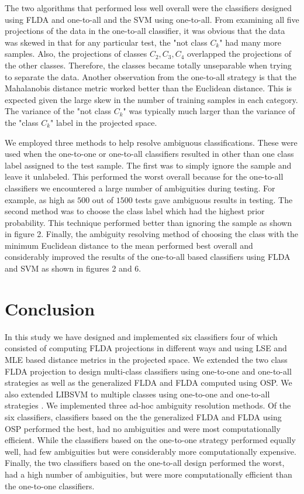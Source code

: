 \documentclass[journal]{IEEEtran}
\begin{document}
\par The two algorithms that performed less well overall were the classifiers designed using FLDA and one-to-all and the SVM using one-to-all. From examining all five projections of the data in the one-to-all classifier, it was obvious that the data was skewed in that for any particular test, the "not class \(C_k\)" had many more samples. Also, the projections of classes \(C_2, C_3, C_4\) overlapped the projections of the other classes. Therefore, the classes became totally unseparable when trying to separate the data. Another observation from the one-to-all strategy is that the Mahalanobis distance metric worked better than the Euclidean distance. This is expected given the large skew in the number of training samples in each category. The variance of the "not class \(C_k\)" was typically much larger than the variance of the "class \(C_k\)" label in the projected space.
\par We employed three methods to help resolve ambiguous classifications. These were used when the one-to-one or one-to-all classifiers resulted in other than one class label assigned to the test sample. The first was to simply ignore the sample and leave it unlabeled. This performed the worst overall because for the one-to-all classifiers we encountered a large number of ambiguities during testing. For example, as high as \(500\) out of \(1500\) tests gave ambiguous results in testing. The second method was to choose the class label which had the highest prior probability. This technique performed better than ignoring the sample as shown in figure 2. Finally, the ambiguity resolving method of choosing the class with the minimum Euclidean distance to the mean performed best overall and considerably improved the results of the one-to-all based classifiers using FLDA and SVM as shown in figures 2 and 6.

\section{Conclusion}
\par In this study we have designed and implemented six classifiers four of which consisted of computing FLDA projections in different ways and using LSE and MLE based distance metrics in the projected space. We extended the two class FLDA projection to design multi-class classifiers using one-to-one and one-to-all strategies as well as the generalized FLDA and FLDA computed using OSP. We also extended LIBSVM to multiple classes using one-to-one and one-to-all strategies \cite{libsvm}. We implemented three ad-hoc ambiguity resolution methods. Of the six classifiers, classifiers based on the the generalized FLDA and FLDA using OSP performed the best, had no ambiguities and were most computationally efficient. While the classifiers based on the one-to-one strategy performed equally well, had few ambiguities but were considerably more computationally expensive. Finally, the two classifiers based on the one-to-all design performed the worst, had a high number of ambiguities, but were more computationally efficient than the one-to-one classifiers.
\end{document}
